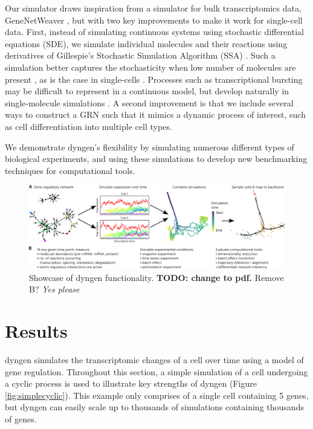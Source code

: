 Our simulator draws inspiration from a simulator for bulk transcriptomics data, GeneNetWeaver \cite{schaffter_genenetweaversilicobenchmark_2011,marbach_wisdomcrowdsrobust_2012}, but with two key improvements to make it work for single-cell data. First, instead of simulating continuous systems using stochastic differential equations (SDE), we simulate individual molecules and their reactions using derivatives of Gillespie's Stochastic Simulation Algorithm (SSA) \cite{gillespie_exactstochasticsimulation_1977}. Such a simulation better captures the stochasticity when low number of molecules are present  \cite{gillespie_exactstochasticsimulation_1977}, as is the case in single-cells \cite{zenklusen_singlernacountingreveals_2008a}. Processes such as transcriptional bursting may be difficult to represent in a continuous model, but develop naturally in single-molecule simulations \cite{schuh_genenetworkstranscriptional_2019}. A second improvement is that we include several ways to construct a GRN such that it mimics a dynamic process of interest, such as cell differentiation into multiple cell types. 

We demonstrate dyngen's flexibility by simulating numerous different types of biological experiments, and using these simulations to develop new benchmarking techniques for computational tools.

\begin{figure}[htb!]
	\centering
	\includegraphics[width=\linewidth]{fig/showcase_3.png} 
	\caption{Showcase of dyngen functionality. \textbf{TODO: change to pdf.} Remove B? \textit{Yes please}} %
	\label{fig:dyngen}
\end{figure}

\section{Results}
dyngen simulates the transcriptomic changes of a cell over time using a model of gene regulation. Throughout this section, a simple simulation of a cell undergoing a cyclic process is used to illustrate key strengths of dyngen (Figure \ref{fig:simplecyclic}). This example only comprises of a single cell containing 5 genes, but dyngen can easily scale up to thousands of simulations containing thousands of genes.

